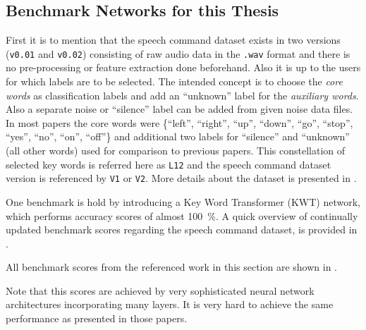 \subsection{Benchmark Networks for this Thesis}\label{sec:prev_kws_benchmark}
First it is to mention that the speech command dataset \cite{Warden2018} exists in two versions (\texttt{v0.01} and \texttt{v0.02}) consisting of raw audio data in the \texttt{.wav} format and there is no pre-processing or feature extraction done beforehand.
Also it is up to the users for which labels are to be selected.
The intended concept is to choose the \emph{core words} as classification labels and add an \enquote{unknown} label for the \emph{auxiliary words}.
Also a separate noise or \enquote{silence} label can be added from given noise data files.
In most papers the core words were \{\enquote{left},  \enquote{right}, \enquote{up}, \enquote{down}, \enquote{go}, \enquote{stop}, \enquote{yes}, \enquote{no}, \enquote{on}, \enquote{off}\} and additional two labels for \enquote{silence} and \enquote{unknown} (all other words) used for comparison to previous papers.
This constellation of selected key words is referred here as \texttt{L12} and the speech command dataset version is referenced by \texttt{V1} or \texttt{V2}.
More details about the dataset is presented in .

One benchmark is hold by \cite{Berg2021} introducing a Key Word Transformer (KWT) network, which performs accuracy scores of almost \SI{100}{\percent}.
A quick overview of continually updated benchmark scores regarding the speech command dataset, is provided in \cite{PaperswithcodeKWS}.

All benchmark scores from the referenced work in this section are shown in .

Note that this scores are achieved by very sophisticated neural network architectures incorporating many layers.
It is very hard to achieve the same performance as presented in those papers.
